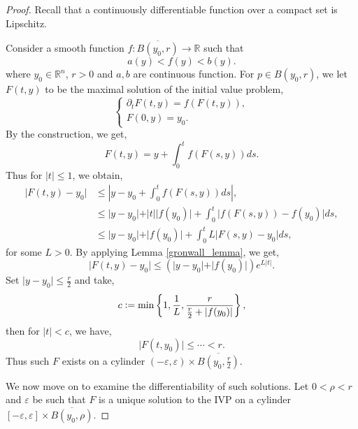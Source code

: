 \documentclass[10pt]{article}
\newcommand{\defeq}{\vcentcolon=}
\newcommand{\R}[0]{\mathbb{R}}
\begin{document}
\setcounter{claim}{0}
\begin{proof}
Recall that a continuously differentiable function over a compact set is Lipschitz. \\
\par Consider a smooth function $f:\overline{B(y_0,r)}\to\R$ such that 
\begin{equation*}
  a(y)<f(y)<b(y).
\end{equation*}
where $y_0\in\R^n$, $r>0$ and $a,b$ are continuous function.  For $p\in B(y_0,r)$, we let $F(t,y)$ to be the maximal solution of the initial value problem,
\begin{equation*}
  \begin{cases}
    \partial_t F(t,y) = f(F(t,y)),\\
    F(0,y) = y_0.
  \end{cases}
  \tag{P1}
\end{equation*}
By the construction, we get,
\begin{equation*}
  F(t,y) = y+\int_0^t f(F(s,y))ds.
\end{equation*}
Thus for $\vert t\vert\leq 1$, we obtain,
\begin{align*}
  \vert F(t,y)-y_0\vert & \leq \left\vert y -y_0+\int_0^t f(F(s,y))ds\right\vert,\\
  & \leq \vert y - y_0\vert +\vert t\vert\vert f(y_0)\vert +\int_0^t\vert f(F(s,y))-f(y_0)\vert ds,\\
  & \leq \vert y-y_0\vert +\vert f(y_0)\vert +\int_0^t L\vert F(s,y)-y_0\vert ds,
\end{align*}
for some $L>0$. By applying Lemma \ref{gronwall_lemma}, we get,
\begin{equation*}
  \vert F(t,y)-y_0\vert \leq (\vert y-y_0\vert+\vert f(y_0)\vert)e^{L\vert t\vert}.
\end{equation*}
Set $\vert y -y_0\vert \leq {\frac r 2}$ and take,
\begin{equation*}
  c\defeq \min\left\{1,{\frac 1 L},{\frac {r} {{\frac r 2}+\vert f(y_0)\vert}}\right\},
\end{equation*}
then for $\vert t\vert<c$, we have,
\begin{equation*}
  \vert F(t,y_0)\vert\leq \cdots <r.
\end{equation*}
Thus such $F$ exists on a cylinder $(-\varepsilon,\varepsilon)\times\overline{B\left(y_0,{\frac r 2}\right)}$.
\par We now move on to examine the differentiability of such solutions. Let $0<\rho<r$ and $\varepsilon$ be such that $F$ is a unique solution to the IVP on a cylinder $[-\varepsilon,\varepsilon]\times \overline{B(y_0,\rho)}$.

\end{proof}
\end{document}
